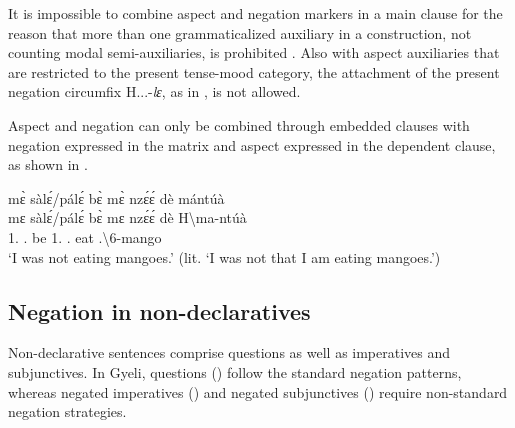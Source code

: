 \documentclass[output=paper,colorlinks=true, citecolor=brown,draftmode]{langscibook}
\begin{document}
It is impossible to combine aspect and negation markers in a main clause for the reason that more than one grammaticalized auxiliary in a construction, not counting modal semi-auxiliaries,  is prohibited . Also with aspect auxiliaries that are restricted to the present tense-mood category, the attachment of the present negation circumfix H...-{\itshape lɛ}, as in , is not allowed. 

\begin{exe} 
\ex\label{PROG2}
\begin{xlist}
\end{xlist}
\end{exe}

Aspect and negation can only be combined through embedded clauses with negation expressed in the matrix and aspect expressed in the dependent clause, as shown in .

\begin{exe} \ex\label{lea1}
  \glll  mɛ̀ sàlɛ́/pálɛ́ bɛ̀ {\ob}mɛ̀ nzɛ́ɛ́ dè mántúà{\cb} \\
          mɛ sàlɛ́/pálɛ́ bɛ̀ {\db}mɛ nzɛ́ɛ́ dè {H\backslash{}ma-ntúà}\\
          1{\SG}.{\PST} {\PST}.{\NEG} be 1{\SG}.{\PST} {\PROG}.{\SUB} eat {{\OBJ}.{\LINK}\backslash{}6-mango}\\
    \trans `I was not eating mangoes.' (lit. `I was not that I am eating mangoes.')
\end{exe}

\subsection{Negation in non-declaratives}
\label{sec:gye:SNnondecl}

Non-declarative sentences comprise questions as well as imperatives and subjunctives. In Gyeli, questions () follow the standard negation patterns, whereas negated imperatives () and negated subjunctives () require non-standard negation strategies. 
\end{document}
